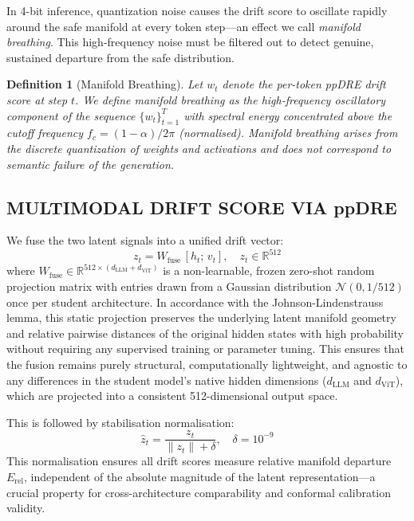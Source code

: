 \documentclass{ieeetmlcn}
\newtheorem{definition}{Definition}
\begin{document}
In 4-bit inference, quantization noise causes the drift score to oscillate rapidly around the safe manifold at every token step---an effect we call \emph{manifold breathing}. This high-frequency noise must be filtered out to detect genuine, sustained departure from the safe distribution.

\begin{definition}[Manifold Breathing]
Let $w_t$ denote the per-token ppDRE drift score at step $t$. We define
\emph{manifold breathing} as the high-frequency oscillatory component of
the sequence $\{w_t\}_{t=1}^T$ with spectral energy concentrated above
the cutoff frequency $f_c = (1-\alpha)/2\pi$ (normalised). Manifold
breathing arises from the discrete quantization of weights and
activations and does not correspond to semantic failure of the
generation.
\end{definition}

\subsection{MULTIMODAL DRIFT SCORE VIA ppDRE}
We fuse the two latent signals into a unified drift vector:
\begin{equation}
  z_t = W_{\text{fuse}}\,[h_t;\, v_t], \quad z_t \in \mathbb{R}^{512}
  \label{eq:fusion}
\end{equation}
where $W_{\text{fuse}} \in \mathbb{R}^{512 \times (d_{\text{LLM}} + d_{\text{ViT}})}$ is a non-learnable, frozen zero-shot random projection matrix with entries drawn from a Gaussian distribution $\mathcal{N}(0, 1 / 512)$ once per student architecture. In accordance with the Johnson-Lindenstrauss lemma, this static projection preserves the underlying latent manifold geometry and relative pairwise distances of the original hidden states with high probability without requiring any supervised training or parameter tuning. This ensures that the fusion remains purely structural, computationally lightweight, and agnostic to any differences in the student model's native hidden dimensions ($d_{\text{LLM}}$ and $d_{\text{ViT}}$), which are projected into a consistent 512-dimensional output space.

This is followed by stabilisation normalisation:
\begin{equation}
  \hat{z}_t = \frac{z_t}{\|z_t\| + \delta}, \quad \delta = 10^{-9}
  \label{eq:norm}
\end{equation}
This normalisation ensures all drift scores measure relative manifold departure $E_{\text{rel}}$, independent of the absolute magnitude of the latent representation---a crucial property for cross-architecture comparability and conformal calibration validity.
\end{document}
